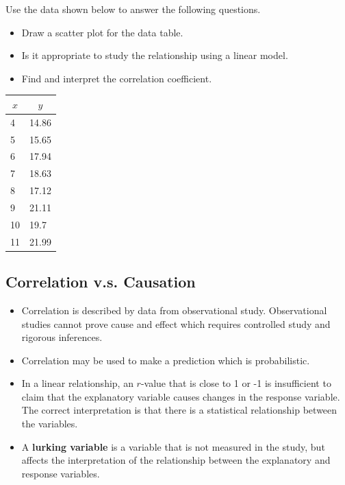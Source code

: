 \begin{exercise}

Use the data shown below to answer the following questions.
\begin{itemize}
  \item
    Draw a scatter plot for the data table.
  \item
    Is it appropriate to study the relationship using a linear model.
  \item
    Find and interpret the correlation coefficient.
  \end{itemize}
  \begin{table}[h]
    \begin{small}
        \begin{tabular}[c]{l|l}
          \hline
          \multicolumn{1}{c|}{\textbf{$x$}} & 
          \multicolumn{1}{c}{\textbf{$y$}} \\
          \hline
          4 & 14.86 \\
          5 & 15.65 \\
          6 & 17.94 \\
          7 & 18.63 \\
          8 & 17.12 \\
          9 & 21.11 \\
          10 & 19.7 \\
          11 & 21.99 \\
          \hline
        \end{tabular}
    \end{small}
  \end{table}
\end{exercise}
\vspace*{2\baselineskip}

\hypertarget{correlation-v.s.-causation}{%
\subsection{Correlation v.s.
Causation}\label{correlation-v.s.-causation}}

\begin{itemize}
\item
  Correlation is described by data from observational study.
  Observational studies cannot prove cause and effect which requires
  controlled study and rigorous inferences.
\item
  Correlation may be used to make a prediction which is probabilistic.
\item
  In a linear relationship, an \(r\)-value that is close to 1 or -1 is
  insufficient to claim that the explanatory variable causes changes in
  the response variable. The correct interpretation is that there is a
  statistical relationship between the variables.
\item
  A \textbf{lurking variable} is a variable that is not measured in the
  study, but affects the interpretation of the relationship between the
  explanatory and response variables.
\end{itemize}

